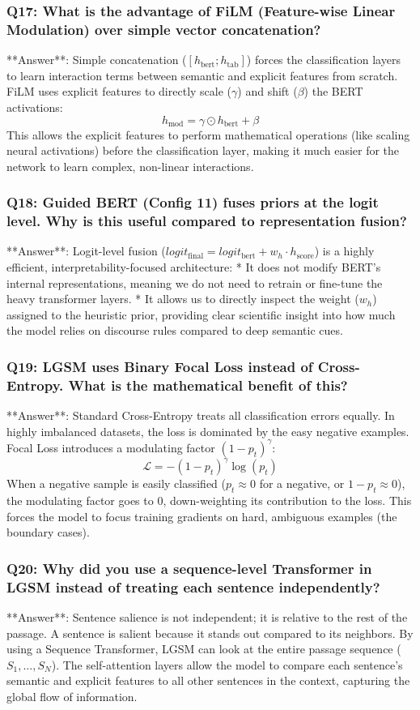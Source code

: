 \documentclass[11pt,a4paper]{article}
\begin{document}
\subsubsection{Q17: What is the advantage of FiLM (Feature-wise Linear Modulation) over simple vector concatenation?}
**Answer**: Simple concatenation ($[h_{\text{bert}}; h_{\text{tab}}]$) forces the classification layers to learn interaction terms between semantic and explicit features from scratch. 
FiLM uses explicit features to directly scale ($\gamma$) and shift ($\beta$) the BERT activations:
\[
h_{\text{mod}} = \gamma \odot h_{\text{bert}} + \beta
\]
This allows the explicit features to perform mathematical operations (like scaling neural activations) before the classification layer, making it much easier for the network to learn complex, non-linear interactions.

\subsubsection{Q18: Guided BERT (Config 11) fuses priors at the logit level. Why is this useful compared to representation fusion?}
**Answer**: Logit-level fusion ($logit_{\text{final}} = logit_{\text{bert}} + w_h \cdot h_{\text{score}}$) is a highly efficient, interpretability-focused architecture:
* It does not modify BERT's internal representations, meaning we do not need to retrain or fine-tune the heavy transformer layers.
* It allows us to directly inspect the weight ($w_h$) assigned to the heuristic prior, providing clear scientific insight into how much the model relies on discourse rules compared to deep semantic cues.

\subsubsection{Q19: LGSM uses Binary Focal Loss instead of Cross-Entropy. What is the mathematical benefit of this?}
**Answer**: Standard Cross-Entropy treats all classification errors equally. In highly imbalanced datasets, the loss is dominated by the easy negative examples. 
Focal Loss introduces a modulating factor $(1 - p_t)^\gamma$:
\[
\mathcal{L} = -(1 - p_t)^\gamma \log(p_t)
\]
When a negative sample is easily classified ($p_t \approx 0$ for a negative, or $1-p_t \approx 0$), the modulating factor goes to 0, down-weighting its contribution to the loss. This forces the model to focus training gradients on hard, ambiguous examples (the boundary cases).

\subsubsection{Q20: Why did you use a sequence-level Transformer in LGSM instead of treating each sentence independently?}
**Answer**: Sentence salience is not independent; it is relative to the rest of the passage. A sentence is salient because it stands out compared to its neighbors. 
By using a Sequence Transformer, LGSM can look at the entire passage sequence ($S_1, \dots, S_N$). The self-attention layers allow the model to compare each sentence's semantic and explicit features to all other sentences in the context, capturing the global flow of information.
\end{document}
